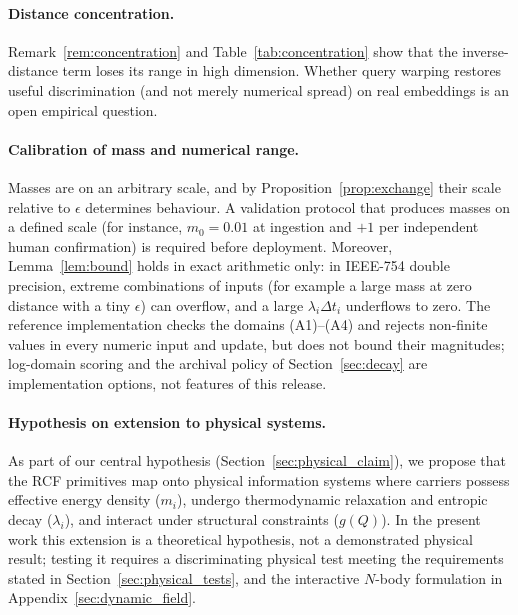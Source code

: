 \documentclass[11pt]{article}
\theoremstyle{remark}
\begin{document}
\paragraph{Distance concentration.}
Remark~\ref{rem:concentration} and Table~\ref{tab:concentration} show that the inverse-distance term loses its range in high dimension. Whether query warping restores useful discrimination (and not merely numerical spread) on real embeddings is an open empirical question.

\paragraph{Calibration of mass and numerical range.}
Masses are on an arbitrary scale, and by Proposition~\ref{prop:exchange} their scale relative to $\epsilon$ determines behaviour. A validation protocol that produces masses on a defined scale (for instance, $m_0=0.01$ at ingestion and $+1$ per independent human confirmation) is required before deployment. Moreover, Lemma~\ref{lem:bound} holds in exact arithmetic only: in IEEE-754 double precision, extreme combinations of inputs (for example a large mass at zero distance with a tiny $\epsilon$) can overflow, and a large $\lambda_i\Delta t_i$ underflows to zero. The reference implementation checks the domains (A1)--(A4) and rejects non-finite values in every numeric input and update, but does not bound their magnitudes; log-domain scoring and the archival policy of Section~\ref{sec:decay} are implementation options, not features of this release.

\paragraph{Hypothesis on extension to physical systems.}
As part of our central hypothesis (Section~\ref{sec:physical_claim}), we propose that the RCF primitives map onto physical information systems where carriers possess effective energy density ($m_i$), undergo thermodynamic relaxation and entropic decay ($\lambda_i$), and interact under structural constraints ($g(Q)$). In the present work this extension is a theoretical hypothesis, not a demonstrated physical result; testing it requires a discriminating physical test meeting the requirements stated in Section~\ref{sec:physical_tests}, and the interactive $N$-body formulation in Appendix~\ref{sec:dynamic_field}.
\end{document}

